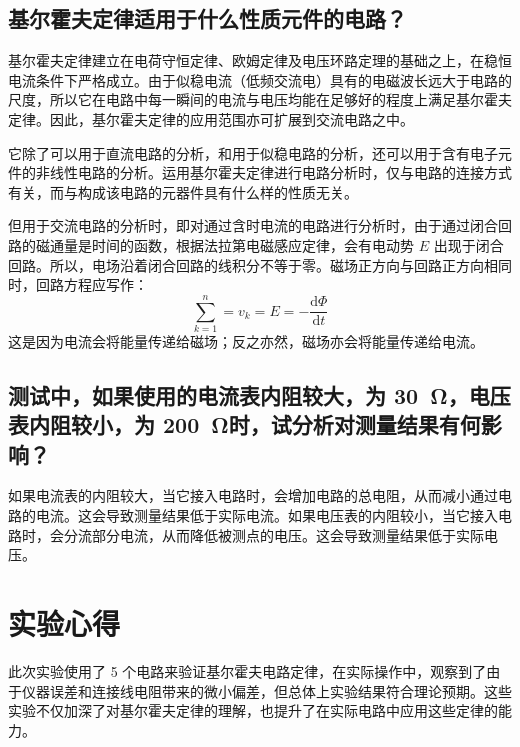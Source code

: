 \documentclass[a4paper,utf8]{article}
\begin{document}
\subsection{基尔霍夫定律适用于什么性质元件的电路？}
基尔霍夫定律建立在电荷守恒定律、欧姆定律及电压环路定理的基础之上，在稳恒电流条件下严格成立。由于似稳电流（低频交流电）具有的电磁波长远大于电路的尺度，所以它在电路中每一瞬间的电流与电压均能在足够好的程度上满足基尔霍夫定律。因此，基尔霍夫定律的应用范围亦可扩展到交流电路之中。\par
它除了可以用于直流电路的分析，和用于似稳电路的分析，还可以用于含有电子元件的非线性电路的分析。运用基尔霍夫定律进行电路分析时，仅与电路的连接方式有关，而与构成该电路的元器件具有什么样的性质无关。\par
但用于交流电路的分析时，即对通过含时电流的电路进行分析时，由于通过闭合回路的磁通量是时间的函数，根据法拉第电磁感应定律，会有电动势 $E$ 出现于闭合回路。所以，电场沿着闭合回路的线积分不等于零。磁场正方向与回路正方向相同时，回路方程应写作：
\begin{equation}
    \sum_{k=1}^{n}=v_k=E=-\frac{\mathrm{d} \Phi}{\mathrm{d} t}
\end{equation}
这是因为电流会将能量传递给磁场；反之亦然，磁场亦会将能量传递给电流。
\subsection{测试中，如果使用的电流表内阻较大，为 \SI{30}{\ohm}，电压表内阻较小，为 \SI{200}{\ohm}时，试分析对测量结果有何影响？}
如果电流表的内阻较大，当它接入电路时，会增加电路的总电阻，从而减小通过电路的电流。这会导致测量结果低于实际电流。如果电压表的内阻较小，当它接入电路时，会分流部分电流，从而降低被测点的电压。这会导致测量结果低于实际电压。
\section{实验心得}
此次实验使用了 5 个电路来验证基尔霍夫电路定律，在实际操作中，观察到了由于仪器误差和连接线电阻带来的微小偏差，但总体上实验结果符合理论预期。这些实验不仅加深了对基尔霍夫定律的理解，也提升了在实际电路中应用这些定律的能力。
\clearpage
\end{document}
